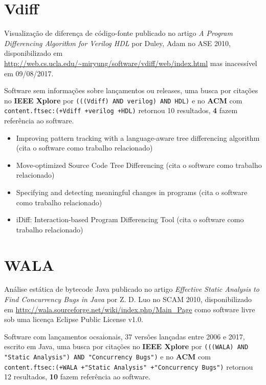 \section{Vdiff}

Visualização de diferença de código-fonte
publicado no artigo {\it A Program Differencing Algorithm for Verilog HDL}
por Duley, Adam
no ASE 2010,
disponibilizado em \url{http://web.cs.ucla.edu/~miryung/software/vdiff/web/index.html}
mas inacessível em 09/08/2017.

Software sem informações sobre lançamentos ou releases,
uma busca por citações no {\bf IEEE Xplore} por
\texttt{(((Vdiff) AND verilog) AND HDL)}
e no {\bf ACM} com
\texttt{content.ftsec:(+Vdiff +verilog +HDL)}
retornou
10 resultados,
{\bf 4} fazem referência ao software.

\begin{itemize}
\item Improving pattern tracking with a language-aware tree differencing algorithm (cita o software como trabalho relacionado)
\item Move-optimized Source Code Tree Differencing (cita o software como trabalho relacionado)
\item Specifying and detecting meaningful changes in programs (cita o software como trabalho relacionado)
\item iDiff: Interaction-based Program Differencing Tool (cita o software como trabalho relacionado)
\end{itemize}

\section{WALA}

Análise estática de bytecode Java
publicado no artigo {\it Effective Static Analysis to Find Concurrency Bugs in Java}
por Z. D. Luo
no SCAM 2010,
disponibilizado em \url{http://wala.sourceforge.net/wiki/index.php/Main_Page}
como software livre
sob uma licença Eclipse Public License v1.0.

Software com lançamentos ocsaionais,
37 versões lançadas
entre 2006 e 2017,
escrito em Java,
uma busca por citações no {\bf IEEE Xplore} por
\texttt{(((WALA) AND "Static Analysis") AND "Concurrency Bugs")}
e no {\bf ACM} com
\texttt{content.ftsec:(+WALA +"Static Analysis" +"Concurrency Bugs")}
retornou
12 resultados,
{\bf 10} fazem referência ao software.

